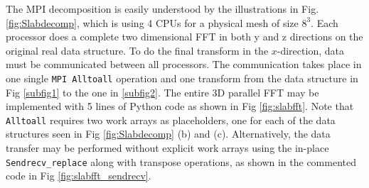 \documentclass[11pt, oneside]{article}
\newcommand{\inpyth}{\lstinline[style=pythonstyle, basicstyle=\ttfamily]} %[]%
\begin{document}
The MPI decomposition is easily understood by the illustrations in Fig. \ref{fig:Slabdecomp}, which is using 4 CPUs for a physical mesh of size $8^3$. Each processor does a complete two dimensional FFT in both y and z directions on the original real data structure. To do the final transform in the $x$-direction, data must be communicated between all processors. The communication takes place in one single \inpyth{MPI Alltoall} operation and one transform from the data structure in Fig \ref{subfig1} to the one in \ref{subfig2}. The entire 3D parallel FFT may be implemented with 5 lines of Python code as shown in Fig \ref{fig:slabfft}. Note that  \inpyth{Alltoall} requires two work arrays as placeholders, one for each of the data structures seen in Fig \ref{fig:Slabdecomp} (b) and (c). Alternatively, the data transfer may be performed without explicit work arrays using the in-place \inpyth{Sendrecv_replace} along with transpose operations, as shown in the commented code in Fig \ref{fig:slabfft_sendrecv}.
\end{document}
